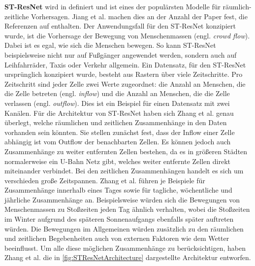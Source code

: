 \textbf{ST-ResNet} wird in \cite{STResNetOriginal} definiert und ist eines der populärsten Modelle für räumlich-zeitliche Vorhersagen.
Jiang et al. machen dies an der Anzahl der Paper fest, die Referenzen auf \cite{STResNetOriginal} enthalten.
Der Anwendungsfall für den ST-ResNet konzipiert wurde, ist die Vorhersage der Bewegung von Menschenmassen (engl. \emph{crowd flow}).
Dabei ist es egal, wie sich die Menschen bewegen.
So kann ST-ResNet beispielsweise nicht nur auf Fußgänger angewendet werden, sondern auch auf Leihfahrräder, Taxis oder Verkehr allgemein.
Ein Datensatz, für den ST-ResNet ursprünglich konzipiert wurde, besteht aus Rastern über viele Zeitschritte.
Pro Zeitschritt sind jeder Zelle zwei Werte zugeordnet: die Anzahl an Menschen, die die Zelle betreten (engl. \emph{inflow}) und die Anzahl an Menschen, die die Zelle verlassen (engl. \emph{outflow}).
Dies ist ein Beispiel für einen Datensatz mit zwei Kanälen.
Für die Architektur von ST-ResNet haben sich Zhang et al. genau überlegt, welche räumlichen und zeitlichen Zusammenhänge in den Daten vorhanden sein könnten.
Sie stellen zunächst fest, dass der Inflow einer Zelle abhängig ist vom Outflow der benachbarten Zellen.
Es können jedoch auch Zusammenhänge zu weiter entfernten Zellen bestehen, da es in größeren Städten normalerweise ein U-Bahn Netz gibt, welches weiter entfernte Zellen direkt miteinander verbindet.
Bei den zeitlichen Zusammenhängen handelt es sich um verschieden große Zeitspannen.
Zhang et al. führen je Beispiele für Zusammenhänge innerhalb eines Tages sowie für tagliche, wöchentliche und jährliche Zusammenhänge an.
Beispielsweise würden sich die Bewegungen von Menschenmassen zu Stoßzeiten jeden Tag ähnlich verhalten, wobei die Stoßzeiten im Winter aufgrund des späteren Sonnenaufgangs ebenfalls später auftreten würden.
Die Bewegungen im Allgemeinen würden zusätzlich zu den räumlichen und zeitlichen Begebenheiten auch von externen Faktoren wie dem Wetter beeinflusst.
Um alle diese möglichen Zusammenhänge zu berücksichtigen, haben Zhang et al. die in \autoref{fig:STResNetArchitecture} dargestellte Architektur entworfen.

